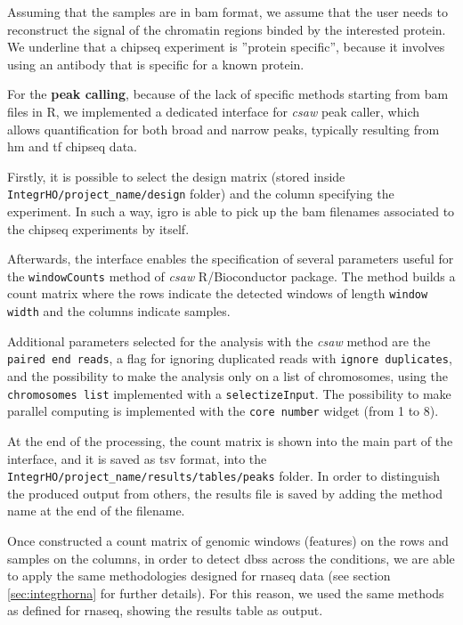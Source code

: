 
Assuming that the samples are in \gls{bam} format, we assume that the user needs to reconstruct the signal of the chromatin regions binded by the interested protein.
We underline that a \gls{chipseq} experiment is ''protein specific'', because it involves using an antibody that is specific for a known protein.

For the \textbf{peak calling}, because of the lack of specific methods starting from \gls{bam} files in R, we implemented a dedicated interface for \textit{csaw} \cite{Lun2015} peak caller, which allows quantification for both broad and narrow peaks, typically resulting from \gls{hm} and \gls{tf} \gls{chipseq} data.

Firstly, it is possible to select the design matrix (stored inside \lstinline!IntegrHO/project_name/design! folder) and the column specifying the experiment.
In such a way, \gls{igro} is able to pick up the \gls{bam} filenames associated to the \gls{chipseq} experiments by itself.

Afterwards, the interface enables the specification of several parameters useful for the \lstinline!windowCounts! method of \textit{csaw} R/Bioconductor package.
The method builds a count matrix where the rows indicate the detected windows of length \lstinline!window width! and the columns indicate samples.

Additional parameters selected for the analysis with the \textit{csaw} method are the \lstinline!paired end reads!, a flag for ignoring duplicated reads with \lstinline!ignore duplicates!, and the possibility to make the analysis only on a list of chromosomes, using the \lstinline!chromosomes list! implemented with a \lstinline!selectizeInput!.
The possibility to make parallel computing is implemented with the \lstinline!core number! widget (from 1 to 8).

At the end of the processing, the count matrix is shown into the main part of the interface, and it is saved as \gls{tsv} format, into the \lstinline!IntegrHO/project_name/results/tables/peaks! folder.
In order to distinguish the produced output from others, the results file is saved by adding the method name at the end of the filename.

Once constructed a count matrix of genomic windows (features) on the rows and samples on the columns, in order to detect \glspl{dbs} across the conditions, we are able to apply the same methodologies designed for \gls{rnaseq} data (see section \ref{sec:integrhorna} for further details).
For this reason, we used the same methods as defined for \gls{rnaseq}, showing the results table as output.

